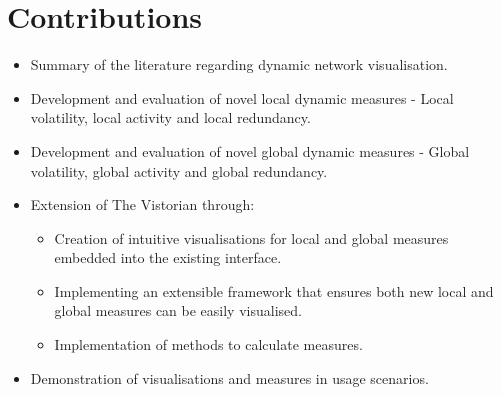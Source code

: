 \section{Contributions}
\label{objectives}
\begin{itemize}
    \item Summary of the literature regarding dynamic network visualisation.
    \item Development and evaluation of novel local dynamic measures - Local volatility, local activity and local redundancy.
    \item Development and evaluation of novel global dynamic measures - Global volatility, global activity and global redundancy.
    \item Extension of The Vistorian through:
    \begin{itemize}
        \item Creation of intuitive visualisations for local and global measures embedded into the existing interface.
        \item Implementing an extensible framework that ensures both new local and global measures can be easily visualised.
        \item Implementation of methods to calculate measures.
    \end{itemize}
    \item Demonstration of visualisations and measures in usage scenarios.


\end{itemize}





